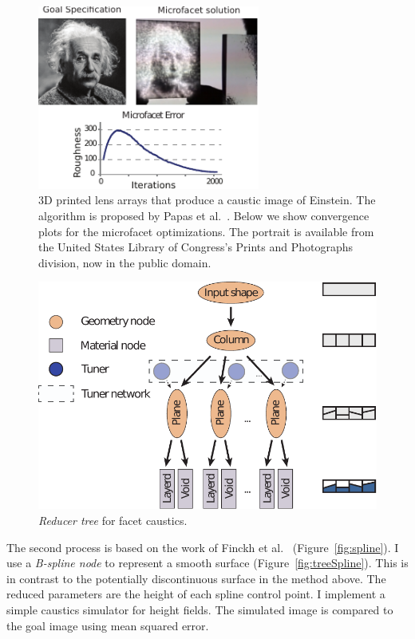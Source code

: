 \begin{figure}
\centering
\includegraphics[width=0.65\textwidth]{figure/facet.pdf}
\caption {3D printed lens arrays that produce a caustic image of Einstein.
The algorithm is proposed by Papas et al.~.
Below we show convergence plots for the microfacet optimizations.
The portrait is available from the United States Library of Congress's Prints and Photographs division,
now in the public domain.
}
\label{fig:facet}
\end{figure}

\begin{figure}
\centering
\includegraphics[scale=0.7]{figure/treeFacet.pdf}
\caption {\emph{Reducer tree} for facet caustics.
}
\label{fig:treeFacet}
\end{figure}

The second process is based on the work of Finckh et al.~ (Figure~\ref{fig:spline}).
I use a \emph{B-spline node} to represent a smooth surface (Figure~\ref{fig:treeSpline}).
This is in contrast to the potentially discontinuous surface in the method above.
The reduced parameters are the height of each spline control point.
I implement a simple caustics simulator for height fields.
The simulated image is compared to the goal image using mean squared error.

